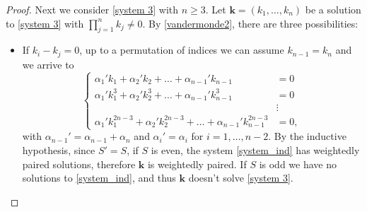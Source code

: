 \documentclass[10pt,a4paper]{amsart}
\def \k{\bm{k}}
\begin{document}
\begin{proof}


\medskip

 Next we consider \eqref{system 3} with $n\geq 3$.
Let $\k = (k_1,\ldots,k_n)$ be a solution to \eqref{system 3} with $\prod_{j=1}^n k_j \neq 0$.
By \eqref{vandermonde2}, there are three possibilities:

\begin{itemize}
\item If $k_i-k_j=0$, up to a permutation of indices we can assume $k_{n-1}=k_n$ and we arrive to 
\begin{equation}\label{system_ind}
\begin{cases}
\alpha_1' k_1 + \alpha_2' k_2+\ldots+ \alpha_{n-1}' k_{n-1} & = 0 \\
\alpha_1' k_1^3 + \alpha_2' k_2^3 + \ldots+ \alpha_{n-1}' k_{n-1}^3 & = 0 \\
& \vdots \\
\alpha_1' k_1^{2n-3} + \alpha_2' k_2^{2n-3} +\ldots + \alpha_{n-1}' k_{n-1}^{2n-3} & =0,
\end{cases}
\end{equation}
with $\alpha_{n-1}' = \alpha_{n-1}+\alpha_{n}$ and $\alpha_i' = \alpha_i$ for $i=1,\ldots,n-2$. 
By the inductive hypothesis, since $S'=S$, if $S$ is even, the system \eqref{system_ind} has weightedly paired solutions, therefore $\k$ is weightedly paired. If $S$ is odd we have no solutions to \eqref{system_ind}, and thus $\k$ doesn't solve \eqref{system 3}. 


\end{itemize}
\end{proof}
\end{document}
